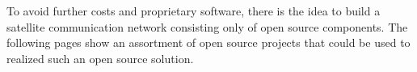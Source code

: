 To avoid further costs and proprietary software, there is the idea to build a satellite communication network consisting only of open source components.
\newline
The following pages show an assortment of open source projects that could be used to realized such an open source solution.